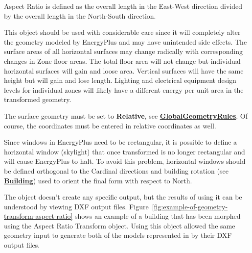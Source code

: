 Aspect Ratio is defined as the overall length in the East-West direction divided by the overall length in the North-South direction.

This object should be used with considerable care since it will completely alter the geometry modeled by EnergyPlus and may have unintended side effects. The surface areas of all horizontal surfaces may change radically with corresponding changes in Zone floor areas. The total floor area will not change but individual horizontal surfaces will gain and loose area. Vertical surfaces will have the same height but will gain and lose length. Lighting and electrical equipment design levels for individual zones will likely have a different energy per unit area in the transformed geometry.

The surface geometry must be set to \textbf{Relative}, see \textbf{\hyperref[globalgeometryrules]{GlobalGeometryRules}}. Of course, the coordinates must be entered in relative coordinates as well.

Since windows in EnergyPlus need to be rectangular, it is possible to define a horizontal window (skylight) that once transformed is no longer rectangular and will cause EnergyPlus to halt. To avoid this problem, horizontal windows should be defined orthogonal to the Cardinal directions and building rotation (see \textbf{\hyperref[building]{Building}}) used to orient the final form with respect to North.

The object doesn't create any specific output, but the results of using it can be understood by viewing DXF output files. Figure~\ref{fig:example-of-geometry-transform-aspect-ratio} shows an example of a building that has been morphed using the Aspect Ratio Transform object. Using this object allowed the same geometry input to generate both of the models represented in by their DXF output files.

